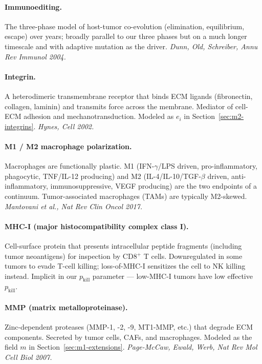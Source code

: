 \documentclass[11pt,letterpaper]{article}
\begin{document}
\paragraph{Immunoediting.}
The three-phase model of host-tumor co-evolution (elimination,
equilibrium, escape) over years; broadly parallel to our three phases
but on a much longer timescale and with adaptive mutation as the
driver. \emph{Dunn, Old, Schreiber, Annu Rev Immunol 2004.}

\paragraph{Integrin.}
A heterodimeric transmembrane receptor that binds ECM ligands
(fibronectin, collagen, laminin) and transmits force across the
membrane. Mediator of cell-ECM adhesion and mechanotransduction.
Modeled as $e_i$ in Section~\ref{sec:m2-integrins}.
\emph{Hynes, Cell 2002.}

\paragraph{M1 / M2 macrophage polarization.}
Macrophages are functionally plastic. M1 (IFN-$\gamma$/LPS driven,
pro-inflammatory, phagocytic, TNF/IL-12 producing) and M2
(IL-4/IL-10/TGF-$\beta$ driven, anti-inflammatory, immunosuppressive,
VEGF producing) are the two endpoints of a continuum. Tumor-associated
macrophages (TAMs) are typically M2-skewed. \emph{Mantovani et al.,
Nat Rev Clin Oncol 2017.}

\paragraph{MHC-I (major histocompatibility complex class I).}
Cell-surface protein that presents intracellular peptide fragments
(including tumor neoantigens) for inspection by CD8$^+$ T cells.
Downregulated in some tumors to evade T-cell killing; loss-of-MHC-I
sensitizes the cell to NK killing instead. Implicit in our $p_{\text{kill}}$
parameter --- low-MHC-I tumors have low effective $p_{\text{kill}}$.

\paragraph{MMP (matrix metalloproteinase).}
Zinc-dependent proteases (MMP-1, -2, -9, MT1-MMP, etc.) that degrade
ECM components. Secreted by tumor cells, CAFs, and macrophages.
Modeled as the field $m$ in Section~\ref{sec:m1-extensions}.
\emph{Page-McCaw, Ewald, Werb, Nat Rev Mol Cell Biol 2007.}
\end{document}
